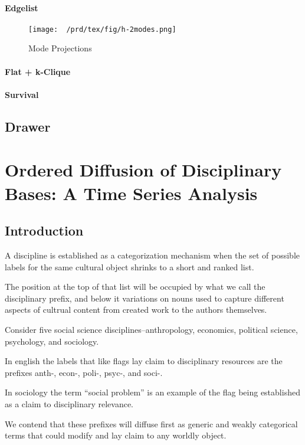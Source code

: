 \documentclass [PhD] {uclathes}
\begin{document}
\subsubsection{Edgelist}\label{edgelist}

\begin{figure}[htbp]
\centering
\texttt{[image: ~/prd/tex/fig/h-2modes.png]}
\caption{Mode Projections}
\end{figure}

\subsubsection{Flat + k-Clique}\label{flat-k-clique}

\subsubsection{Survival}\label{survival}

\section{Drawer}\label{drawer}
 \chapter{Ordered Diffusion of Disciplinary Bases: A Time Series Analysis}
\section{Introduction}\label{introduction}

A discipline is established as a categorization mechanism when the set
of possible labels for the same cultural object shrinks to a short and
ranked list.

The position at the top of that list will be occupied by what we call
the disciplinary prefix, and below it variations on nouns used to
capture different aspects of cultrual content from created work to the
authors themselves.

Consider five social science disciplines--anthropology, economics,
political science, psychology, and sociology.

In english the labels that like flags lay claim to disciplinary
resources are the prefixes anth-, econ-, poli-, psyc-, and soci-.

In sociology the term ``social problem'' is an example of the flag being
established as a claim to disciplinary relevance.

We contend that these prefixes will diffuse first as generic and weakly
categorical terms that could modify and lay claim to any worldly object.
\end{document}

